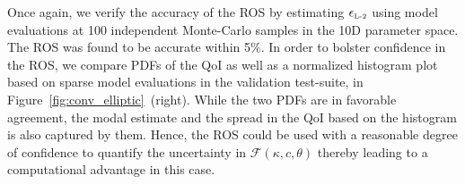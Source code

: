 Once again, we verify the accuracy of the ROS by estimating $\epsilon_{\mbox{\tiny{L-2}}}$
using model evaluations at 100 independent Monte-Carlo samples in the 10D parameter
space. The ROS was found to be accurate
within 5$\%$. In order to bolster confidence in the ROS, we compare PDFs of the QoI
as well as a normalized histogram plot based on sparse model evaluations in the  
validation test-suite, in 
Figure~\ref{fig:conv_elliptic}~(right). While the two PDFs are in favorable agreement,
the modal estimate and the spread in the QoI based on the histogram is also captured
by them. Hence, the ROS could be used with a reasonable degree of confidence to
quantify the uncertainty in $\mathcal{F}(\kappa, c, \theta)$ thereby leading to
a computational advantage in this case.































